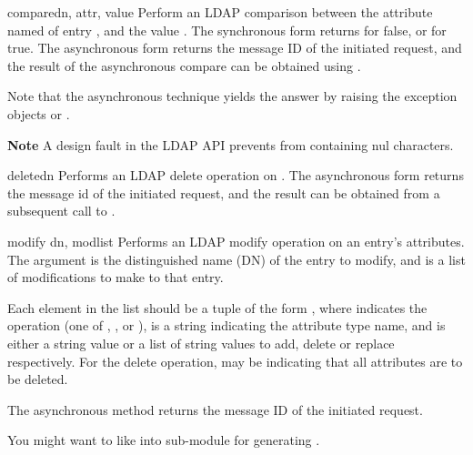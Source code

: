 
\begin{methoddesc}[LDAP]{compare}{dn, attr, value} %
Perform an LDAP comparison between the attribute named  of 
entry , and the value . The synchronous form
returns  for false, or  for true.
The asynchronous form returns the message ID of the initiated request, 
and the result of the asynchronous compare can be obtained using 
.  

Note that the asynchronous technique yields the answer
by raising the exception objects  or
.

\textbf{Note} A design fault in the LDAP API prevents  
from containing nul characters.
\end{methoddesc}


\begin{methoddesc}[LDAP]{delete}{dn} %
Performs an LDAP delete operation on . The asynchronous form
returns the message id of the initiated request, and the result can be obtained
from a subsequent call to .
\end{methoddesc}


\begin{methoddesc}[LDAP]{modify}{ dn, modlist } %
Performs an LDAP modify operation on an entry's attributes. 
The  argument is the distinguished name (DN) of the entry to modify,
and  is a list of modifications to make to that entry.

Each element in the list  should be a tuple of the form 
,
where  indicates the operation (one of , 
, or ),
 is a string indicating the attribute type name, and 
 is either a string value or a list of string values to add, 
delete or replace respectively.  For the delete operation, 
may be  indicating that all attributes are to be deleted.

The asynchronous method  returns the message ID of the 
initiated request.

You might want to like into sub-module  for
generating .
\end{methoddesc}

